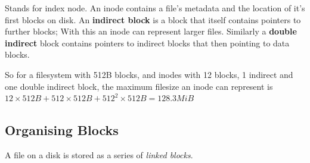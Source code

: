 \documentclass[a4]{article}
\begin{document}
Stands for index node. An inode contains a file's metadata and the location of it's first blocks on disk.
An \textbf{indirect block} is a block that itself contains pointers to further blocks; With this an inode can represent larger files. Similarly a \textbf{double indirect} block contains pointers to indirect blocks that then pointing to data blocks.

So for a filesystem with 512B blocks, and inodes with 12 blocks, 1 indirect and one double indirect block, the maximum filesize an inode can represent is ${12 \times 512B + 512 \times 512B + 512^2 \times 512B = 128.3 MiB}$



\subsection{Organising Blocks}

A file on a disk is stored as a series of \textit{linked blocks}. 
\end{document}
